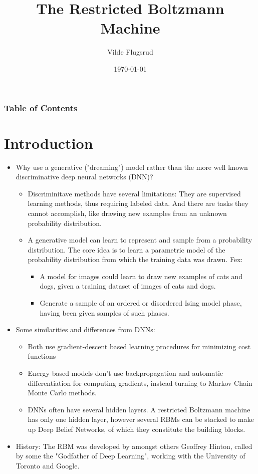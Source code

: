 \documentclass[norsk,a4paper,11pt]{beamer}
\title{The Restricted Boltzmann Machine}
\author{Vilde Flugsrud}
\institute{Department of Physics, UiO}
\date{\today}
\begin{document}
\frame{\titlepage}

\begin{frame}
\frametitle{Table of Contents}
\tableofcontents
\end{frame}


\section{Introduction}
\begin{frame}
\begin{itemize}
	\item Why use a generative ("dreaming") model rather than the more well known discriminative deep neural networks (DNN)? 
	\begin{itemize}
		\item Discriminitave methods have several limitations: They are supervised learning methods, thus requiring labeled data. And there are tasks they cannot accomplish, like drawing new examples from an unknown probability distribution.
		\item A generative model can learn to represent and sample from a probability distribution. The core idea is to learn a parametric model of the probability distribution from which the training data was drawn. Fex: 
		\begin{itemize}
			\item A model for images could learn to draw new examples of cats and dogs, given a training dataset of images of cats and dogs.
			\item Generate a sample of an ordered or disordered Ising model phase, having been given samples of such phases.
		\end{itemize}
	\end{itemize}
\end{itemize}
\end{frame}

\begin{frame}
\begin{itemize}
	\item Some similarities and differences from DNNs:
	\begin{itemize}
		\item Both use gradient-descent based learning procedures for minimizing cost functions
		\item Energy based models don't use backpropagation and automatic differentiation for computing gradients, instead turning to Markov Chain Monte Carlo methods.
		\item DNNs often have several hidden layers. A restricted Boltzmann machine has only one hidden layer, however several RBMs can be stacked to make up Deep Belief Networks, of which they constitute the building blocks.
	\end{itemize}
	\item History: The RBM was developed by amongst others Geoffrey Hinton, called by some the "Godfather of Deep Learning", working with the University of Toronto and Google.
\end{itemize}
\end{frame}
\end{document}
